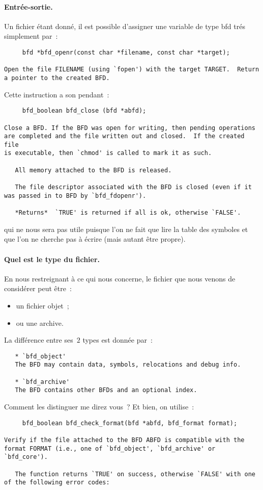 \documentclass{article}
\begin{document}
\paragraph{Entr\'ee-sortie.}
Un fichier \'etant donn\'e, il est possible d'assigner une variable de
type bfd tr\'es simplement par~:
\begin{verbatim}
     bfd *bfd_openr(const char *filename, const char *target);

Open the file FILENAME (using `fopen') with the target TARGET.  Return
a pointer to the created BFD.
\end{verbatim}
Cette instruction a son pendant~:
\begin{verbatim}
     bfd_boolean bfd_close (bfd *abfd);

Close a BFD. If the BFD was open for writing, then pending operations
are completed and the file written out and closed.  If the created file
is executable, then `chmod' is called to mark it as such.

   All memory attached to the BFD is released.

   The file descriptor associated with the BFD is closed (even if it
was passed in to BFD by `bfd_fdopenr').

   *Returns*  `TRUE' is returned if all is ok, otherwise `FALSE'.
\end{verbatim}
qui ne nous sera pas utile puisque l'on ne fait que lire la table des
symboles et que l'on ne cherche pas \`a \'ecrire (mais autant \^etre
propre).
\paragraph{Quel est le type du fichier.}
En nous restreignant \`a ce qui nous concerne, le fichier que nous
venons de consid\'erer peut \^etre~:
\begin{itemize}
\item un fichier objet~;
\item ou une archive.
\end{itemize}
La diff\'erence entre ses~$2$ types est donn\'ee par~:
\begin{verbatim}
   * `bfd_object'
   The BFD may contain data, symbols, relocations and debug info.

   * `bfd_archive'
   The BFD contains other BFDs and an optional index.
\end{verbatim}
Comment les distinguer me direz vous~? Et bien, on utilise~:
\begin{verbatim}
     bfd_boolean bfd_check_format(bfd *abfd, bfd_format format);

Verify if the file attached to the BFD ABFD is compatible with the
format FORMAT (i.e., one of `bfd_object', `bfd_archive' or `bfd_core').

   The function returns `TRUE' on success, otherwise `FALSE' with one
of the following error codes:
\end{verbatim}
\end{document}
